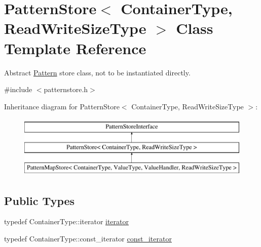 \hypertarget{classPatternStore}{}\section{Pattern\+Store$<$ Container\+Type, Read\+Write\+Size\+Type $>$ Class Template Reference}
\label{classPatternStore}


Abstract \hyperlink{classPattern}{Pattern} store class, not to be instantiated directly.  




{\ttfamily \#include $<$patternstore.\+h$>$}

Inheritance diagram for Pattern\+Store$<$ Container\+Type, Read\+Write\+Size\+Type $>$\+:\begin{figure}[H]
\begin{center}
\leavevmode
\includegraphics[height=3.000000cm]{classPatternStore}
\end{center}
\end{figure}
\subsection*{Public Types}
\begin{DoxyCompactItemize}
\item 
typedef Container\+Type\+::iterator \hyperlink{classPatternStore_a2bcb8a35edcee7c35eb125ea3d2655ae}{iterator}
\item 
typedef Container\+Type\+::const\+\_\+iterator \hyperlink{classPatternStore_a7d9724742a6e593e6d970bcd5540c6aa}{const\+\_\+iterator}
\end{DoxyCompactItemize}
